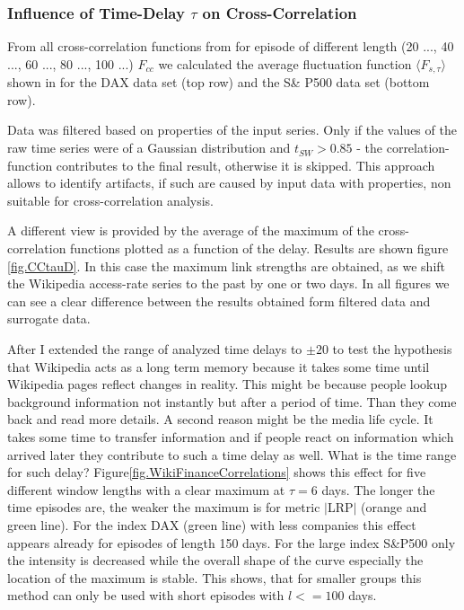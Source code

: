 \documentclass[a4paper,10pt]{scrbook}
\begin{document}
\subsubsection{Influence of Time-Delay $\tau$ on Cross-Correlation} 
From all cross-correlation functions from for episode of different length (20 ..., 40 ..., 60 ..., 80 ..., 100 ...) $F_{cc}$ we calculated the average fluctuation function $ \langle F_{s,\tau} \rangle$ shown in \label{fig.CCtauA} for the DAX data set (top row) and the S\& P500 data set (bottom row).

\label{ext.fig.CCtauA} 


Data was filtered based on properties of the input series. Only if the values of the 
raw time series were of a Gaussian distribution and $t_{SW} > 0.85$ - the correlation-function contributes to the final result, otherwise it is skipped. This approach allows to identify artifacts, if such are caused by input data with properties, non suitable for cross-correlation analysis.


%

A different view is provided by the average of the maximum of the cross-correlation functions plotted as a function of the delay. Results are shown figure \ref{fig.CCtauD}. In this case the maximum link strengths are obtained, as we shift the Wikipedia access-rate series to the past by one or two days. In all figures we can see a clear difference between the results obtained form filtered data and surrogate data.


\label{ext.fig.WikiFinanceCorrelations} 


After I extended the range of analyzed time delays to $\pm 20$ to test the hypothesis that Wikipedia acts as a long term memory because it takes some time until Wikipedia pages reflect changes in reality. This might be because people lookup background information not instantly but after a period of time. Than they come back and read more details. A second reason might be the media life cycle. It takes some time to transfer information and if people react on information which arrived later they contribute to such a time delay as well. What is the time range for such delay? Figure\ref{fig.WikiFinanceCorrelations} shows this effect for five different window lengths with a clear maximum at $\tau = 6$ days. The longer the time episodes are, the weaker the maximum is for metric $\vert$LRP$\vert$ (orange and green line). For the index DAX (green line) with less companies this effect appears already for episodes of length 150 days. For the large index S\&P500 only the intensity is decreased while the overall shape of the curve especially the location of the maximum is stable. This shows, that for smaller groups this method can only be used with short episodes with $ l <= 100$ days. 
 
\end{document}
